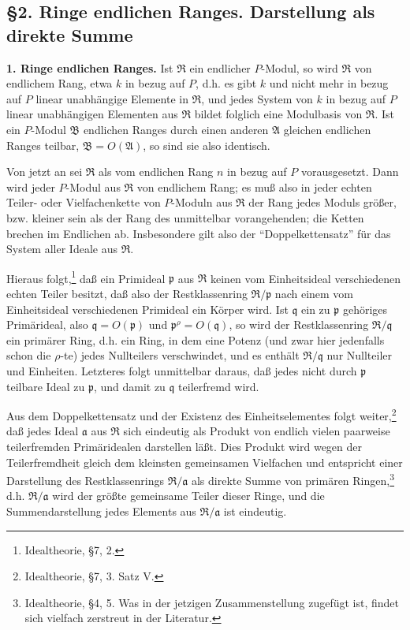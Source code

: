 \documentclass[11pt]{article}
\begin{document}
\subsection*{\S 2. Ringe endlichen Ranges. Darstellung als direkte Summe}

\textbf{1. Ringe endlichen Ranges.} Ist $\mathfrak R$ ein endlicher $P$-Modul, so wird $\mathfrak R$ von endlichem Rang, etwa $k$ in bezug auf $P$, d.h. es gibt $k$ und nicht mehr in bezug auf $P$ linear unabhängige Elemente in $\mathfrak R$, und jedes System von $k$ in bezug auf $P$ linear unabhängigen Elementen aus $\mathfrak R$ bildet folglich eine Modulbasis von $\mathfrak R$. Ist ein $P$-Modul $\mathfrak B$ endlichen Ranges durch einen anderen $\mathfrak A$ gleichen endlichen Ranges teilbar, $\mathfrak B=O(\mathfrak A)$, so sind sie also identisch.

Von jetzt an sei $\mathfrak R$ als vom endlichen Rang $n$ in bezug auf $P$ vorausgesetzt. Dann wird jeder $P$-Modul aus $\mathfrak R$ von endlichem Rang; es muß also in jeder echten Teiler- oder Vielfachenkette von $P$-Moduln aus $\mathfrak R$ der Rang jedes Moduls größer, bzw. kleiner sein als der Rang des unmittelbar vorangehenden; die Ketten brechen im Endlichen ab. Insbesondere gilt also der ``Doppelkettensatz'' für das System aller Ideale aus $\mathfrak R$.

Hieraus folgt,\footnote{Idealtheorie, \S 7, 2.} daß ein Primideal $\mathfrak p$ aus $\mathfrak R$ keinen vom Einheitsideal verschiedenen echten Teiler besitzt, daß also der Restklassenring $\mathfrak R/\mathfrak p$ nach einem vom Einheitsideal verschiedenen Primideal ein Körper wird. Ist $\mathfrak q$ ein zu $\mathfrak p$ gehöriges Primärideal, also $\mathfrak q=O(\mathfrak p)$ und $\mathfrak p^{\rho}=O(\mathfrak q)$, so wird der Restklassenring $\mathfrak R/\mathfrak q$ ein primärer Ring, d.h. ein Ring, in dem eine Potenz (und zwar hier jedenfalls schon die $\rho$-te) jedes Nullteilers verschwindet, und es enthält $\mathfrak R/\mathfrak q$ nur Nullteiler und Einheiten. Letzteres folgt unmittelbar daraus, daß jedes nicht durch $\mathfrak p$ teilbare Ideal zu $\mathfrak p$, und damit zu $\mathfrak q$ teilerfremd wird.

Aus dem Doppelkettensatz und der Existenz des Einheitselementes folgt weiter,\footnote{Idealtheorie, \S 7, 3. Satz V.} daß jedes Ideal $\mathfrak a$ aus $\mathfrak R$ sich eindeutig als Produkt von endlich vielen paarweise teilerfremden Primäridealen darstellen läßt. Dies Produkt wird wegen der Teilerfremdheit gleich dem kleinsten gemeinsamen Vielfachen und entspricht einer Darstellung des Restklassenrings $\mathfrak R/\mathfrak a$ als direkte Summe von primären Ringen,\footnote{Idealtheorie, \S 4, 5. Was in der jetzigen Zusammenstellung zugefügt ist, findet sich vielfach zerstreut in der Literatur.} d.h. $\mathfrak R/\mathfrak a$ wird der größte gemeinsame Teiler dieser Ringe, und die Summendarstellung jedes Elements aus $\mathfrak R/\mathfrak a$ ist eindeutig.
\end{document}
